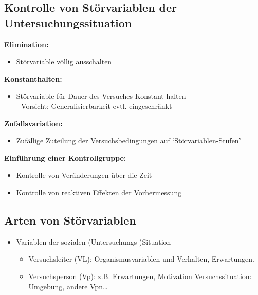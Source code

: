 \documentclass[
]{book}
\providecommand{\tightlist}{%
  \setlength{\itemsep}{0pt}\setlength{\parskip}{0pt}}
\begin{document}
\hypertarget{kontrolle-von-stuxf6rvariablen-der-untersuchungssituation}{%
\subsection{Kontrolle von Störvariablen der Untersuchungssituation}\label{kontrolle-von-stuxf6rvariablen-der-untersuchungssituation}}

\textbf{Elimination:}

\begin{itemize}
\tightlist
\item
  Störvariable völlig ausschalten
\end{itemize}

\textbf{Konstanthalten:}

\begin{itemize}
\tightlist
\item
  Störvariable für Dauer des Versuches Konstant halten\\
  - Vorsicht: Generalisierbarkeit evtl. eingeschränkt
\end{itemize}

\textbf{Zufallsvariation:}

\begin{itemize}
\tightlist
\item
  Zufällige Zuteilung der Versuchsbedingungen auf `Störvariablen-Stufen'
\end{itemize}

\textbf{Einführung einer Kontrollgruppe:}

\begin{itemize}
\tightlist
\item
  Kontrolle von Veränderungen über die Zeit
\item
  Kontrolle von reaktiven Effekten der Vorhermessung
\end{itemize}

\hypertarget{arten-von-stuxf6rvariablen-2}{%
\subsection{Arten von Störvariablen}\label{arten-von-stuxf6rvariablen-2}}

\begin{itemize}
\item
  Variablen der sozialen (Untersuchungs-)Situation

  \begin{itemize}
  \item
    Versuchsleiter (VL): Organismusvariablen und Verhalten, Erwartungen.
  \item
    Versuchsperson (Vp): z.B. Erwartungen, Motivation Versuchssituation: Umgebung, andere Vpn\ldots{}
  \end{itemize}
\end{itemize}
\end{document}
